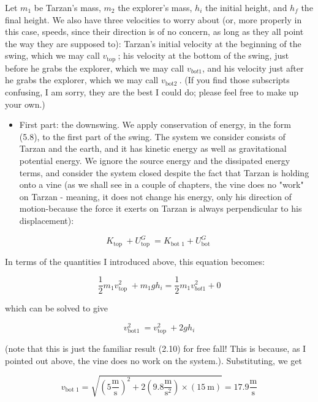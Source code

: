 \documentclass[10pt]{article}
\begin{document}
Let $m_{1}$ be Tarzan's mass, $m_{2}$ the explorer's mass, $h_{i}$ the initial height, and $h_{f}$ the final height. We also have three velocities to worry about (or, more properly in this case, speeds, since their direction is of no concern, as long as they all point the way they are supposed to): Tarzan's initial velocity at the beginning of the swing, which we may call $v_{\text {top }}$; his velocity at the bottom of the swing, just before he grabs the explorer, which we may call $v_{b o t 1}$, and his velocity just after he grabs the explorer, which we may call $v_{\text {bot2 }}$. (If you find those subscripts confusing, I am sorry, they are the best I could do; please feel free to make up your own.)

\begin{itemize}
  \item First part: the downswing. We apply conservation of energy, in the form (5.8), to the first part of the swing. The system we consider consists of Tarzan and the earth, and it has kinetic energy as well as gravitational potential energy. We ignore the source energy and the dissipated energy terms, and consider the system closed despite the fact that Tarzan is holding onto a vine (as we shall see in a couple of chapters, the vine does no "work" on Tarzan - meaning, it does not change his energy, only his direction of motion-because the force it exerts on Tarzan is always perpendicular to his displacement):
\end{itemize}


\begin{equation*}
K_{\text {top }}+U_{\text {top }}^{G}=K_{\text {bot } 1}+U_{\text {bot }}^{G} \tag{5.9}
\end{equation*}


In terms of the quantities I introduced above, this equation becomes:

$$
\frac{1}{2} m_{1} v_{\text {top }}^{2}+m_{1} g h_{i}=\frac{1}{2} m_{1} v_{b o t 1}^{2}+0
$$

which can be solved to give


\begin{equation*}
v_{\text {bot1 }}^{2}=v_{\text {top }}^{2}+2 g h_{i} \tag{5.10}
\end{equation*}


(note that this is just the familiar result (2.10) for free fall! This is because, as I pointed out above, the vine does no work on the system.). Substituting, we get

$$
v_{\text {bot } 1}=\sqrt{\left(5 \frac{\mathrm{m}}{\mathrm{s}}\right)^{2}+2\left(9.8 \frac{\mathrm{m}}{\mathrm{s}^{2}}\right) \times(15 \mathrm{~m})}=17.9 \frac{\mathrm{m}}{\mathrm{s}}
$$
\end{document}
